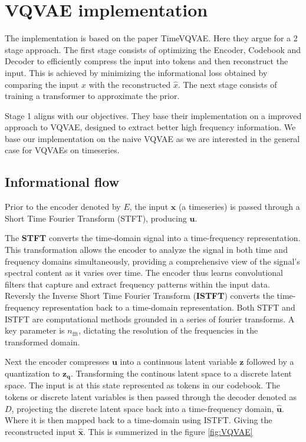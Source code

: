 \section{VQVAE implementation}
The implementation is based on the paper TimeVQVAE\cite{lee2023masked}. Here they argue for a 2 stage approach. The first stage consists of optimizing the Encoder, Codebook and Decoder to efficiently compress the input into tokens and then reconstruct the input.
This is achieved by minimizing the informational loss obtained by comparing the input $x$ with the reconstructed $\hat{x}$. The next stage consists of training a transformer to approximate the prior.

Stage 1 aligns with our objectives. They base their implementation on a improved approach to VQVAE, designed to extract better high frequency information. We base our implementation on the naive VQVAE as we are interested in the general case for VQVAEs on timeseries.

\subsection{Informational flow}
Prior to the encoder denoted by $E$, the input $\mathbf{x}$ (a timeseries) is passed through a Short Time Fourier Transform (STFT), producing $\mathbf{u}$. 

The \textbf{STFT} converts the time-domain signal into a time-frequency representation. This transformation allows the encoder to analyze the signal in both time and frequency domains simultaneously, providing a comprehensive view of the signal's spectral content as it varies over time. 
The encoder thus learns convolutional filters that capture and extract frequency patterns within the input data.
Reversly the Inverse Short Time Fourier Transform (\textbf{ISTFT}) converts the time-frequency representation back to a time-domain representation. 
Both STFT and ISTFT are computational methods grounded in a series of fourier transforms. A key parameter is $n_{\text{fft}}$, dictating the resolution of the frequencies in the transformed domain.

Next the encoder compresses $\mathbf{u}$ into a continuous latent variable $\mathbf{z}$ followed by a quantization to $\mathbf{z_q}$. Transforming the continous latent space to a discrete latent space. The input is at this state represented as tokens in our codebook.
The tokens or discrete latent variables is then passed through the decoder denoted as $D$, projecting the discrete latent space back into a time-frequency domain, $\hat{\mathbf{u}}$. Where it is then mapped back to a time-domain using ISTFT.
Giving the reconstructed input $\mathbf{\hat{x}}$. This is summerized in the figure \ref{fig:VQVAE}

